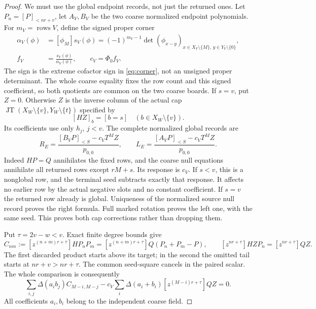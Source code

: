 \documentclass[11pt,a4paper]{amsart}
\numberwithin{equation}{section}
\theoremstyle{plain}
\theoremstyle{definition}
\newcommand{\JT}{\operatorname{JT}}
\begin{document}
\begin{proof}
We must use the global endpoint records, not just the returned ones.
Let \(P_n=[P]_{<nr+v}\), let \(A_V,B_V\) be the two coarse normalized
endpoint polynomials.  For \(m_V=\operatorname{rows}V\), define
the signed proper corner
\[
 \begin{aligned}
 \alpha_V(\phi)&=[\phi_M]s_V(\phi)
   =(-1)^{m_V-1}
      \det(\phi_{x-y})_{
        x\in X_V\setminus\{M\},\,y\in Y_V\setminus\{0\}},\\
 f_V&=\frac{s_V(\phi)}{\alpha_V(\phi)},\qquad c_V=\Phi_0 f_V.
 \end{aligned}
\]
The sign is the extreme cofactor sign in \eqref{eq:corner},
not an unsigned proper determinant.
The whole coarse equality fixes the row count and this signed
coefficient, so both quotients are common on the two coarse boards.
If \(s=v\), put \(Z=0\).  Otherwise \(Z\) is the inverse column
of the actual cap \(\JT(X_W\setminus\{v\},Y_W\setminus\{t\})\)
specified by
\[
 [HZ]_b=[b=s]\quad(b\in X_W\setminus\{v\}).
\]
Its coefficients use only \(h_j\), \(j<v\).  The complete normalized
global records are
\begin{equation}\label{rt:self-global-records}
 R_E=\frac{[B_VP]_{<S}-c_VT^MZ}{p_{0,0}},\qquad
 L_E=\frac{[A_VP]_{<S}-c_VT^MZ}{p_{0,0}}.
\end{equation}
Indeed \(HP=Q\) annihilates the fixed rows, and the coarse null
equations annihilate all returned rows except \(rM+s\).  Its response
is \(c_V\).  If \(s<v\), this is a nonglobal row, and the terminal
seed subtracts exactly that response.  It affects no earlier row by
the actual negative slots and no constant coefficient.  If \(s=v\)
the returned row already is global.  Uniqueness of the normalized
source null record proves the right formula.  Full marked rotation
proves the left one, with the same seed.  This proves both cap
corrections rather than dropping them.

Put \(\tau=2v-w<v\).  Exact finite degree bounds give
\[
 C_{nm}:=[z^{(n+m)r+\tau}]HP_nP_m
       =[z^{(n+m)r+\tau}]Q(P_n+P_m-P),
 \qquad
 [z^{nr+\tau}]HZP_n=[z^{nr+\tau}]QZ.
\]
The first discarded product starts above its target; in the second
the omitted tail starts at \(nr+v>nr+\tau\).
The common seed-square cancels in the paired scalar.  The whole
comparison is consequently
\begin{equation}\label{rt:self-positive-scalar}
 \sum_{i,j}\Delta(a_i b_j)C_{M-i,M-j}
 -c_V\sum_i\Delta(a_i+b_i)[z^{(M-i)r+\tau}]QZ=0.
\end{equation}
All coefficients \(a_i,b_i\) belong to the independent coarse field.


\end{proof}
\end{document}
